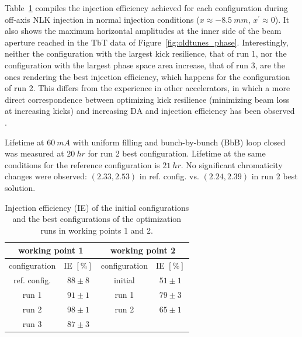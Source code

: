 \documentclass[a4paper,
               keeplastbox,   %
               ]{jacow}
\begin{document}
Table~\ref{table1} compiles the injection efficiency achieved for each configuration during off-axis NLK injection in normal injection conditions ($x\approx -8.5~\unit{mm}$, $x^\prime\approx 0 $). It also shows the maximum horizontal amplitudes at the inner side of the beam aperture reached in the TbT data of Figure~\ref{fig:oldtunes_phase}. Interestingly, neither the configuration with the largest kick resilience, that of run 1, nor the configuration with the largest phase space area increase, that of run 3, are the ones rendering the best injection efficiency, which happens for the configuration of run 2. This differs from the experience in other accelerators, in which a more direct correspondence between optimizing kick resilience (minimizing beam loss at increasing kicks) and increasing DA and injection efficiency has been observed \cite{Olsson:IPAC2018-WEPAL047}. 

Lifetime at $60~\unit{mA}$ with uniform filling and bunch-by-bunch (BbB) loop closed was measured at $20~\unit{hr}$ for run 2 best configuration. Lifetime at the same conditions for the reference configuration is $21~\unit{hr}$. No significant chromaticity changes were observed: $(2.33, 2.53)$ in ref. config. vs. $(2.24, 2.39)$ in run 2 best solution.  
\begin{table}[!h]
\centering
\caption{Injection efficiency (IE) of the initial configurations and the best configurations of the optimization runs in working points 1 and 2.} 
\begin{tabular}{cccc}
\hline
\multicolumn{2}{c}{working point 1}         & \multicolumn{2}{c}{working point 2}                \\ \hline
configuration & IE $[\%]$ & configuration        & IE $[\%]$ \\ \hline
ref. config.  & $88\pm8$                & initial              & $51\pm1$                \\
run 1         & $91\pm1$                & run 1                & $79\pm3$                \\
run 2         & $98\pm1$                & run 2                & $65\pm1    $                \\
run 3         & $87\pm3$                & \multicolumn{1}{l}{} & \multicolumn{1}{l}{}        \\ \hline
\end{tabular}

\label{table1}
\end{table}
\end{document}
